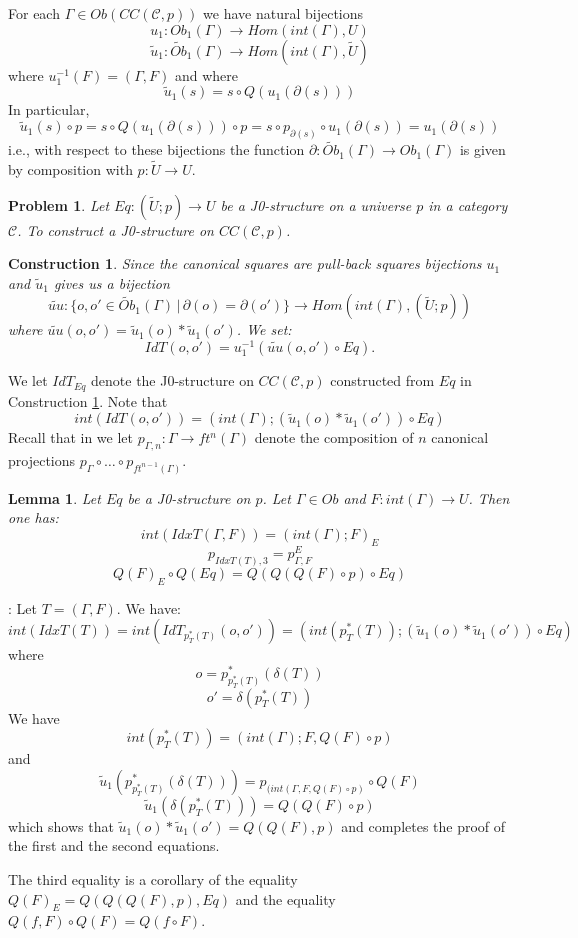 \documentclass[12pt]{article}
\newenvironment{eq}{\begin{equation}}{\end{equation}}
\newenvironment{myproof}{{\bf Proof}:}{\vskip 5mm }
\newtheorem{lemma}[proposition]{Lemma}
\newtheorem{problem}[proposition]{Problem}
\newtheorem{construction}[proposition]{Construction}
\newcommand{\llabel}[1]{\label{#1}}
\newcommand{\sr}{\rightarrow}
\newcommand{\wt}{\widetilde}
\begin{document}
For each $\Gamma\in Ob(CC({\mathcal C},p))$ we have natural bijections 
%
\begin{eq}
\llabel{2015.03.27.eq7b}
u_1:Ob_1(\Gamma)\sr Hom(int(\Gamma),U)
\end{eq}
%
\begin{eq}
\llabel{2015.03.27.eq7a}
\wt{u}_1:\wt{Ob}_1(\Gamma)\sr Hom(int(\Gamma),\wt{U})
\end{eq}
%
where $u_1^{-1}(F)=(\Gamma,F)$ and where
%
\begin{eq}
\llabel{2015.03.31.eq5}
\wt{u}_1(s)=s\circ Q(u_1(\partial(s)))
\end{eq}
%
In particular,
%
$$\wt{u}_1(s)\circ p=s\circ Q(u_1(\partial(s)))\circ p=s\circ p_{\partial(s)}\circ u_1(\partial(s))=u_1(\partial(s))$$
%
i.e., with respect to these bijections the function $\partial:\wt{Ob}_1(\Gamma)\sr Ob_1(\Gamma)$ is given by composition with $p:\wt{U}\sr U$. 
%
\begin{problem}
\llabel{2015.03.27.prob3}
Let $Eq:(\wt{U};p)\sr U$ be a J0-structure on a universe $p$ in a category $\mathcal C$. To construct a J0-structure on $CC({\mathcal C},p)$.
\end{problem}
%
\begin{construction}\rm
\llabel{2015.03.27.constr3}
Since the canonical squares are pull-back squares bijections $u_1$ and $\wt{u}_1$ gives us a bijection
%
$$\wt{uu}:\{o,o'\in\wt{Ob}_1(\Gamma)\,|\,\partial(o)=\partial(o')\} \sr Hom(int(\Gamma),(\wt{U};p))$$
%
where $\wt{uu}(o,o')=\wt{u}_1(o)*\wt{u}_1(o')$. We set:
%
$$IdT(o,o')=u_1^{-1}(\wt{uu}(o,o')\circ Eq).$$
%
\end{construction}
%
We let $IdT_{Eq}$ denote the J0-structure on $CC({\mathcal C},p)$ constructed from $Eq$ in Construction \ref{2015.03.27.constr3}. Note that
%
\begin{eq}
\llabel{2015.03.31.eq1}
int(IdT(o,o'))=(int(\Gamma);(\wt{u}_1(o)*\wt{u}_1(o'))\circ Eq)
\end{eq}
%
Recall that in \cite{Csubsystems} we let $p_{\Gamma,n}:\Gamma\sr ft^n(\Gamma)$ denote the composition of $n$ canonical projections $p_{\Gamma}\circ \dots\circ p_{ft^{n-1}(\Gamma)}$. 
%
\begin{lemma}
\llabel{2015.03.27.l1}
Let $Eq$ be a J0-structure on $p$. Let $\Gamma\in Ob$ and $F:int(\Gamma)\sr U$. Then one has:
%
$$int(IdxT(\Gamma,F))=(int(\Gamma);F)_{E}$$
$$p_{IdxT(T),3} = p^E_{\Gamma,F}$$
$$Q(F)_{E}\circ Q(Eq)=Q(Q(Q(F)\circ p)\circ Eq)$$
%
%
\end{lemma}
%
\begin{myproof}
Let $T=(\Gamma,F)$. We have:
%
$$int(IdxT(T))=int(IdT_{p_T^*(T)}(o,o'))=(int(p_T^*(T));(\wt{u}_1(o)*\wt{u}_1(o'))\circ Eq)$$
%
where 
%
$$o=p_{p_T^*(T)}^*(\delta(T))$$
$$o'=\delta(p_T^*(T))$$
%
We have
%
$$int(p_T^*(T))=(int(\Gamma);F,Q(F)\circ p)$$
%
and
%
$$\wt{u}_1(p_{p_T^*(T)}^*(\delta(T)))=p_{(int(\Gamma,F, Q(F)\circ p)}\circ Q(F)$$
$$\wt{u}_1(\delta(p_T^*(T)))=Q(Q(F)\circ p)$$
%
which shows that $\wt{u}_1(o)*\wt{u}_1(o')=Q(Q(F),p)$ and completes the proof of the first and the second equations.

The third equality is a corollary of the equality $Q(F)_{E}=Q(Q(Q(F),p),Eq)$ and the equality $Q(f,F)\circ Q(F)=Q(f\circ F)$. 
\end{myproof}
\end{document}
